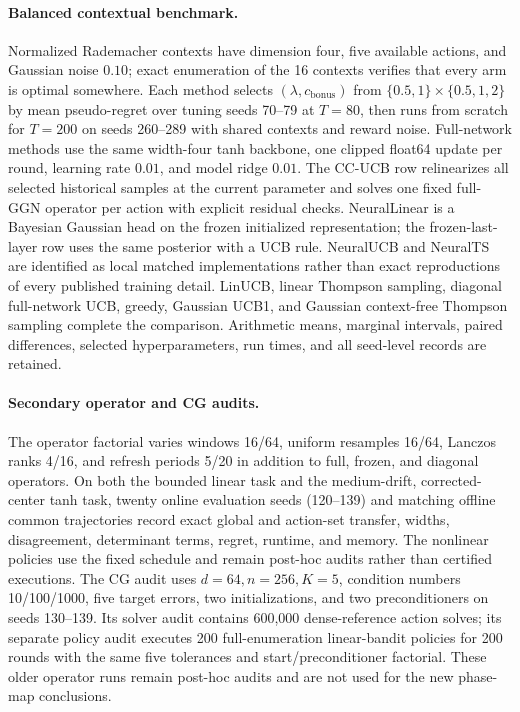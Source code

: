\documentclass[twoside]{article}
\newcommand{\cbonus}{c_{\mathrm{bonus}}} %
\begin{document}
\paragraph{Balanced contextual benchmark.}
Normalized Rademacher contexts have dimension four, five available actions, and
Gaussian noise $0.10$; exact enumeration of the 16 contexts verifies that every
arm is optimal somewhere.  Each method selects $(\lambda,\cbonus)$ from
$\{0.5,1\}\times\{0.5,1,2\}$ by mean pseudo-regret over tuning seeds 70--79
at $T=80$, then runs from scratch for $T=200$ on seeds 260--289 with shared
contexts and reward noise.  Full-network methods use the same width-four tanh
backbone, one clipped float64 update per round, learning rate $0.01$, and model
ridge $0.01$.  The CC-UCB row relinearizes all selected historical samples at
the current parameter and solves one fixed full-GGN operator per action with
explicit residual checks.  NeuralLinear is a Bayesian Gaussian head on the
frozen initialized representation; the frozen-last-layer row uses the same
posterior with a UCB rule.  NeuralUCB and NeuralTS are identified as local
matched implementations rather than exact reproductions of every published
training detail.  LinUCB, linear Thompson sampling, diagonal full-network UCB,
greedy, Gaussian UCB1, and Gaussian context-free Thompson sampling complete the
comparison.  Arithmetic means, marginal intervals, paired differences, selected
hyperparameters, run times, and all seed-level records are retained.

\paragraph{Secondary operator and CG audits.}
The operator factorial varies windows 16/64, uniform resamples 16/64, Lanczos ranks
4/16, and refresh periods 5/20 in addition to full, frozen, and diagonal operators.
On both the bounded linear task and the medium-drift, corrected-center tanh task,
twenty online evaluation seeds (120--139) and matching offline common trajectories
record exact global and action-set transfer, widths, disagreement, determinant
terms, regret, runtime, and memory.  The nonlinear policies use the fixed schedule
and remain post-hoc audits rather than certified executions.  The CG audit uses
$d=64,n=256,K=5$, condition
numbers 10/100/1000, five target errors, two initializations, and two
preconditioners on seeds 130--139.  Its solver audit contains 600,000 dense-reference
action solves; its separate policy audit executes 200 full-enumeration linear-bandit
policies for 200 rounds with the same five tolerances and start/preconditioner
factorial.  These older operator runs remain post-hoc audits and are not used for
the new phase-map conclusions.
\end{document}
